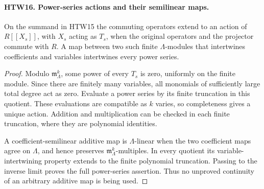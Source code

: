 \documentclass[11pt,a4paper]{article}
\numberwithin{equation}{section}
\theoremstyle{remark}\newtheorem{remark}[theorem]{Remark}
\begin{document}
\paragraph{HTW16. Power-series actions and their semilinear maps.}
\label{claim:HTW16}
On the summand in HTW15 the commuting operators extend
to an action of \(R[[X_s]]\), with \(X_s\) acting as \(T_s\),
when the original operators and the projector commute
with \(R\).  A map between two such finite
\(\Lambda\)-modules that intertwines coefficients and
variables intertwines every power series.
\begin{proof}
Modulo \(\mathfrak m_\Lambda^k\), some power of every
\(T_s\) is zero, uniformly on the finite module.
Since there are finitely many variables, all monomials
of sufficiently large total degree act as zero.
Evaluate a power series by its finite truncation in
this quotient.  These evaluations are compatible as
\(k\) varies, so completeness gives a unique action.
Addition and multiplication can be checked in each
finite truncation, where they are polynomial identities.

A coefficient-semilinear additive map is
\(\Lambda\)-linear when the two coefficient maps agree
on \(\Lambda\), and hence preserves
\(\mathfrak m_\Lambda^k\)-multiples.  In every quotient
its variable-intertwining property extends to the
finite polynomial truncation.  Passing to the inverse
limit proves the full power-series assertion.
Thus no unproved continuity of an arbitrary additive
map is being used.
\end{proof}

\end{document}
